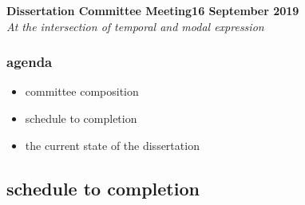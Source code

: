 \documentclass[11pt,dvipsnames]{article}
\begin{document}
\noindent\textbf{{Dissertation Committee Meeting}\hfill 16 September 2019}\\
\textit{At the intersection of temporal and modal expression}\\


\subsubsection*{agenda}
\begin{itemize}
	\item committee composition
	\item schedule to completion
	\item the current state of the dissertation
	
\end{itemize}


\subsection*{schedule to completion}
\end{document}
